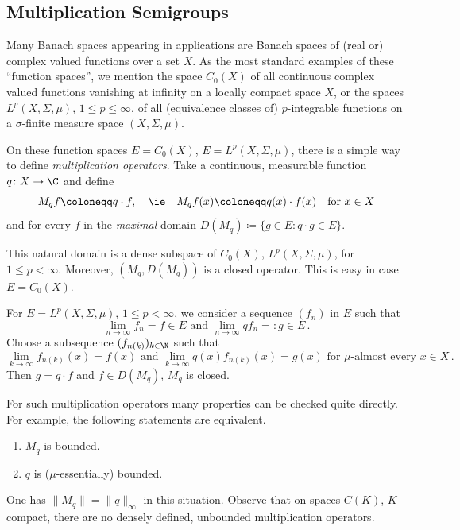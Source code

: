 \subsection{Multiplication Semigroups}\label{subsec:a1-2.3}%
Many Banach spaces appearing in applications are Banach spaces of (real or) complex valued functions over a set $X$.
As the most standard examples of these \enquote{function spaces}, we mention the space $C_{0}(X)$ of all continuous complex valued functions vanishing at infinity on a locally compact space $X$, or the spaces $L^{p}(X,\Sigma,\mu)$, $1 \leq p \leq \infty$, of all (equivalence classes of) $p$-integrable functions on a $\sigma$-finite measure space $(X,\Sigma,\mu)$.

On these function spaces $E = C_{0}(X)$, \resp $E = L^{p}(X,\Sigma,\mu)$, there is a simple way to define \emph{multiplication operators}.
Take a continuous, \resp measurable function $q \colon X \to \C$ and define
\[
    M_{q}f \coloneqq q \cdot f, \quad \text{\ie} \quad M_{q}f(x) 
    \coloneqq q(x) 	\cdot f(x) \quad \text{for } x \in X 
\]
and for every $f$ in the \emph{maximal} domain $D(M_{q}) \coloneqq \{g \in E \colon q \cdot g \in E\}$.

This natural domain is a dense subspace of\/ $C_{0}(X)$, \resp $L^{p}(X,\Sigma,\mu)$, for $1 \leq p < \infty$.
Moreover, $(M_{q},D(M_{q}))$ is a closed operator.
This is easy in case $E = C_{0}(X)$.

For $E = L^{p}(X,\Sigma,\mu)$, $1 \leq p < \infty$, we consider a sequence $(f_{n})$ in $E$ such that 
\[
\lim_{n \to \infty} f_{n} = f \in E \text{ and } \lim_{n \to \infty} qf_{n} = \colon g \in E\,.
\]
Choose a subsequence $(f_{n(k)})_{k \in \N}$ such that 
\[
\lim_{k \to \infty} f_{n(k)}(x) = f(x) \text{ and } \lim_{k \to \infty} q(x)f_{n(k)}(x) = g(x) \text{ for } \mu\text{-almost every } x \in X\,.
\]
Then $g = q \cdot f$ and $f \in D(M_{q})$, \ie $M_{q}$ is closed.

For such multiplication operators many properties can be checked quite directly.
For example, the following statements are equivalent.
\begin{enumerate}[\upshape (a)]
\item 
$M_{q}$ is bounded.

\item 
$q$ is ($\mu$-essentially) bounded.
\end{enumerate}
One has $\|M_{q}\| = \|q\|_{\infty}$ in this situation.
Observe that on spaces $C(K)$, $K$ compact, there are no densely defined, unbounded multiplication operators.

